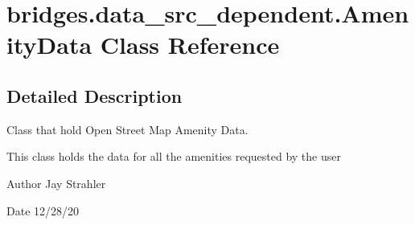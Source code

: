 \hypertarget{classbridges_1_1data__src__dependent_1_1_amenity_data}{}\section{bridges.\+data\+\_\+src\+\_\+dependent.\+Amenity\+Data Class Reference}
\label{classbridges_1_1data__src__dependent_1_1_amenity_data}


\subsection{Detailed Description}
Class that hold Open Street Map Amenity Data. 

This class holds the data for all the amenities requested by the user

\begin{DoxyAuthor}{Author}
Jay Strahler
\end{DoxyAuthor}
\begin{DoxyDate}{Date}
12/28/20 
\end{DoxyDate}
